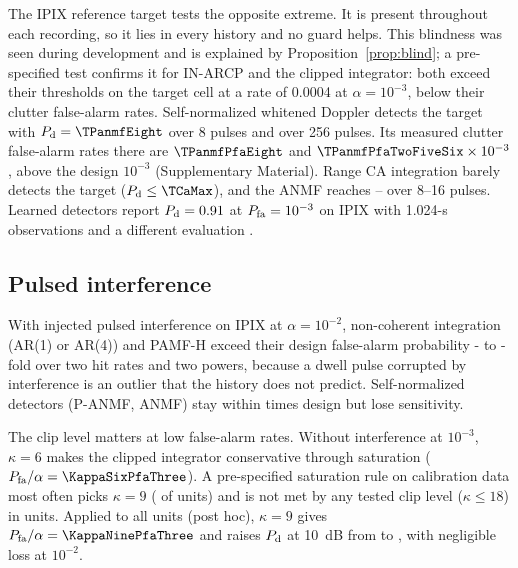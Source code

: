 \documentclass[journal]{IEEEtran}
\begin{document}
\label{sec:realtarget}The IPIX reference target tests the opposite extreme. It is present throughout each recording, so it lies in every history and no guard helps. This blindness was seen during development and is explained by Proposition~\ref{prop:blind}; a pre-specified test confirms it for IN-ARCP and the clipped integrator: both exceed their thresholds on the target cell at a rate of 0.0004 at $\alpha=10^{-3}$, below their clutter false-alarm rates. Self-normalized whitened Doppler detects the target with $P_{\rm d}=\TPanmfEight$ over 8 pulses and \TPanmfTwoFiveSix{} over 256 pulses. Its measured clutter false-alarm rates there are $\TPanmfPfaEight$ and $\TPanmfPfaTwoFiveSix\times10^{-3}$, above the design $10^{-3}$ (Supplementary Material). Range CA integration barely detects the target ($P_{\rm d}\le\TCaMax$), and the ANMF reaches \TFpEight--\TFpSixteen{} over 8--16 pulses. Learned detectors report $P_{\rm d}=0.91$ at $P_{\rm fa}=10^{-3}$ on IPIX with 1.024-s observations and a different evaluation \cite{qu2023sensors}.

\subsection{Pulsed interference}\label{sec:interf}
\begin{table}[!t]
\centering\footnotesize
\caption{Remedies for pulsed interference on IPIX ($\alpha=0.01$, \NUnitsConf{} units). Interference is injected 30~dB above the local power; each pulse is hit with probability $p_{\rm h}$, and bursts are eight pulses long at $p_{\rm h}=5\%$. Entries are the measured $P_{\rm fa}/\alpha$ and the $P_{\rm d}$ of a 10~dB persistent target. Trimmed: \TrimTwo{} ($2\%$) and \TrimFive{} ($5\%$) of eight terms discarded. Bold: $P_{\rm fa}/\alpha>1.2$.}
\label{tab:interf}
\setlength{\tabcolsep}{2.4pt}

\end{table}
With injected pulsed interference on IPIX at $\alpha=10^{-2}$, non-coherent integration (AR(1) or AR(4)) and PAMF-H exceed their design false-alarm probability \IPfaMinAll- to \IPfaMaxInt-fold over two hit rates and two powers, because a dwell pulse corrupted by interference is an outlier that the history does not predict. Self-normalized detectors (P-ANMF, ANMF) stay within \SelfNormIntMax{} times design but lose sensitivity.

The clip level matters at low false-alarm rates. Without interference at $10^{-3}$, $\kappa=6$ makes the clipped integrator conservative through saturation ($P_{\rm fa}/\alpha=\KappaSixPfaThree$). A pre-specified saturation rule on calibration data most often picks $\kappa=9$ ({\KappaNineUnits} of \NUnitsConf{} units) and is not met by any tested clip level ($\kappa\le18$) in \KappaRuleUndefUnits{} units. Applied to all units (post hoc), $\kappa=9$ gives $P_{\rm fa}/\alpha=\KappaNinePfaThree$ and raises $P_{\rm d}$ at 10~dB from \KappaSixPdThree{} to \KappaNinePdThree, with negligible loss at $10^{-2}$.
\end{document}
